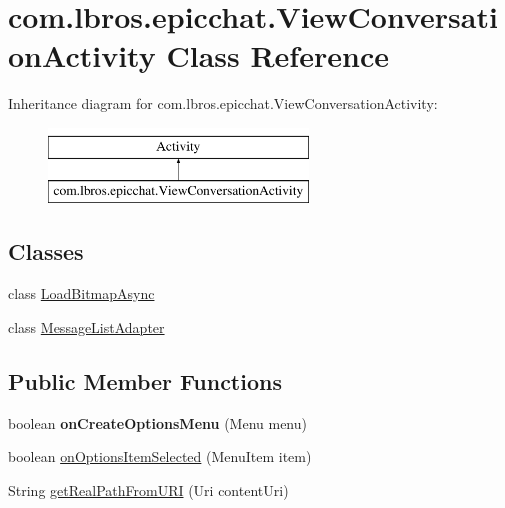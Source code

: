 \hypertarget{classcom_1_1lbros_1_1epicchat_1_1_view_conversation_activity}{\section{com.\-lbros.\-epicchat.\-View\-Conversation\-Activity Class Reference}
\label{classcom_1_1lbros_1_1epicchat_1_1_view_conversation_activity}
}
Inheritance diagram for com.\-lbros.\-epicchat.\-View\-Conversation\-Activity\-:\begin{figure}[H]
\begin{center}
\leavevmode
\includegraphics[height=2.000000cm]{classcom_1_1lbros_1_1epicchat_1_1_view_conversation_activity}
\end{center}
\end{figure}
\subsection*{Classes}
\begin{DoxyCompactItemize}
\item 
class \hyperlink{classcom_1_1lbros_1_1epicchat_1_1_view_conversation_activity_1_1_load_bitmap_async}{Load\-Bitmap\-Async}
\item 
class \hyperlink{classcom_1_1lbros_1_1epicchat_1_1_view_conversation_activity_1_1_message_list_adapter}{Message\-List\-Adapter}
\end{DoxyCompactItemize}
\subsection*{Public Member Functions}
\begin{DoxyCompactItemize}
\item 
\hypertarget{classcom_1_1lbros_1_1epicchat_1_1_view_conversation_activity_a8370ea94af26da698b678054388f93b5}{boolean {\bfseries on\-Create\-Options\-Menu} (Menu menu)}\label{classcom_1_1lbros_1_1epicchat_1_1_view_conversation_activity_a8370ea94af26da698b678054388f93b5}

\item 
boolean \hyperlink{classcom_1_1lbros_1_1epicchat_1_1_view_conversation_activity_a4eab9b662140a739456d5590ca5609f9}{on\-Options\-Item\-Selected} (Menu\-Item item)
\item 
String \hyperlink{classcom_1_1lbros_1_1epicchat_1_1_view_conversation_activity_a0a96a23e84b8b106a247b71f2e51d852}{get\-Real\-Path\-From\-U\-R\-I} (Uri content\-Uri)
\end{DoxyCompactItemize}
